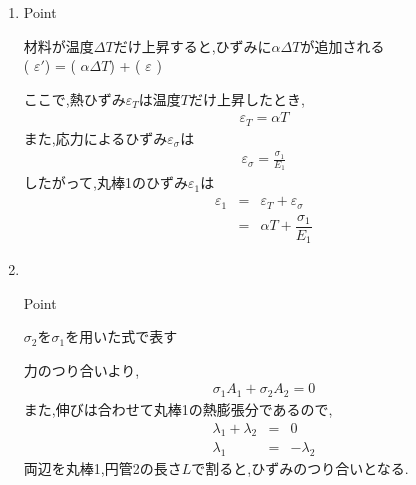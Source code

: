 \documentclass[a4paper]{jsarticle}
\begin{document}
\begin{enumerate}[(1)]
    \item {}
          \begin{itembox}[l]{Point}
              \begin{center}
                  材料が温度$\Delta T$だけ上昇すると,ひずみに$\alpha \Delta T$が追加される\\
                  ( $\varepsilon'$) = ( $\alpha \Delta T$) + ( $\varepsilon$ )
              \end{center}
          \end{itembox}
          ここで,熱ひずみ$\varepsilon_T$は温度$T$だけ上昇したとき,
          \begin{eqnarray*}
              \varepsilon_T=\alpha T
          \end{eqnarray*}
          また,応力によるひずみ$\varepsilon_\sigma$は
          \begin{eqnarray*}
              \varepsilon_\sigma=\frac{\sigma_1}{E_1}
          \end{eqnarray*}
          したがって,丸棒1のひずみ$\varepsilon_1$は
          \begin{eqnarray*}
              \varepsilon_1&=&\varepsilon_T+\varepsilon_\sigma\\
              &=&\alpha T+\dfrac{\sigma_1}{E_1}
          \end{eqnarray*}
    \item {}\\
          \begin{itembox}[l]{Point}
              \begin{center}
                  $\sigma_2$を$\sigma_1$を用いた式で表す
              \end{center}
          \end{itembox}
          力のつり合いより,
          \begin{eqnarray*}
              \sigma_1A_1+\sigma_2A_2=0
          \end{eqnarray*}
          また,伸びは合わせて丸棒1の熱膨張分であるので,
          \begin{eqnarray*}
              \lambda_1+\lambda_2&=&0\\
              \lambda_1&=&-\lambda_2
          \end{eqnarray*}
          両辺を丸棒1,円管2の長さ$L$で割ると,ひずみのつり合いとなる.

\end{enumerate}
\end{document}

